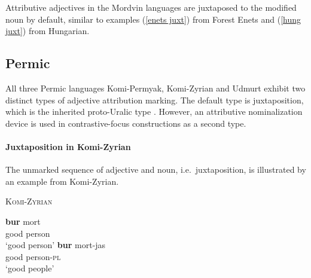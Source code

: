 \noindent Attributive adjectives in the Mordvin languages are juxtaposed to the modified noun by default, similar to examples (\ref{enets juxt}) from Forest Enets and (\ref{hung juxt}) from Hungarian.

\subsection{Permic}
All three Permic languages Komi-Permyak, Komi-Zyrian and Udmurt exhibit two distinct types of adjective attribution marking. The default type is juxtaposition, which is the inherited proto-Uralic type \citep[80–81]{decsy1990}. However, an attributive nominalization device is used in con\-tras\-tive-focus constructions as a second type.

\paragraph{Juxtaposition in Komi-Zyrian}
The unmarked sequence of adjective and noun, i.e.~juxtaposition, is illustrated by an example from Komi-Zyrian.
\begin{exe}
\ex \textsc{Komi-Zyrian} \citep[287]{lytkin1966a}
\begin{xlist} 
\ex
\gll 		\textbf{bur} 	mort\\
		good	person\\
\glt		‘good person’
\ex
\gll		\textbf{bur}	mort-jas\\
		good	person-\textsc{pl}\\
\glt		‘good people’
\end{xlist}
\end{exe}


